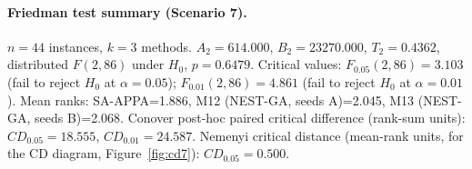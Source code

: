 \endgroup

\paragraph{Friedman test summary (Scenario 7).}
$n=44$ instances, $k=3$ methods. $A_2=614.000$, $B_2=23270.000$, $T_2=0.4362$, distributed $F(2,86)$ under $H_0$, $p=0.6479$. Critical values: $F_{0.05}(2,86)=3.103$ (fail to reject $H_0$ at $\alpha=0.05$); $F_{0.01}(2,86)=4.861$ (fail to reject $H_0$ at $\alpha=0.01$). Mean ranks: SA-APPA=1.886, M12 (NEST-GA, seeds A)=2.045, M13 (NEST-GA, seeds B)=2.068. Conover post-hoc paired critical difference (rank-sum units): $CD_{0.05}=18.555$, $CD_{0.01}=24.587$. Nemenyi critical distance (mean-rank units, for the CD diagram, Figure~\ref{fig:cd7}): $CD_{0.05}=0.500$.
